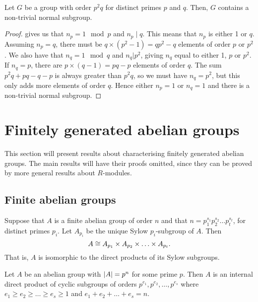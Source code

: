 \begin{lemma}
  Let \(G\) be a group with order \(p^{2}q\) for distinct primes \(p\) and \(q\). Then, \(G\) contains a non-trivial normal subgroup.
\end{lemma}

\begin{proof}
  gives us that \(n_{p} = 1 \mod p\) and \(n_{p} \mid q\). This means that \(n_{p}\) is either 1 or \(q\). Assuming \(n_{p} = q\), there must be \(q \times (p^{2}-1) = qp^{2} - q\) elements of order \(p\) or \(p^{2}\). We also have that \(n_{q} = 1 \mod q\) and \(n_{q} | p^{2}\), giving \(n_{q}\) equal to either 1, \(p\) or \(p^{2}\). If \(n_{q} = p\), there are \(p \times (q -1) = pq - p\) elements of order \(q\). The sum \(p^{2}q + pq -q -p\) is always greater than \(p^{2}q\), so we must have \(n_{q} = p^{2}\), but this only adds more elements of order \(q\). Hence either \(n_{p} =1 \) or \(n_{q} = 1\) and there is a non-trivial normal subgroup.
\end{proof}



\section{Finitely generated abelian groups}
This section will present results about characterising finitely generated abelian groups. The main results will have their proofs omitted, since they can be proved by more general results about \(R\)-modules.

\subsection{Finite abelian groups}

\begin{theorem}
  Suppose that \(A\) is a finite abelian group of order \(n\) and that \(n = p_{1}^{s_{1}}p_{2}^{s_{2}} \ldots p_{t}^{s_{t}}\), for distinct primes \(p_{i}\). Let \(A_{p_{i}}\) be the unique Sylow \(p_{i}\)-subgroup of \(A\). Then
  \[A \cong A_{p_{1}} \times A_{p_{2}} \times \ldots \times A_{p_{t}}.\]
  That is, \(A\) is isomorphic to the direct products of its Sylow subgroups.
\end{theorem}


\begin{theorem}
  Let \(A\) be an abelian group with \(\abs{A} = p^{n}\) for some prime \(p\). Then \(A\) is an internal direct product of cyclic subgroups of orders \(p^{e_{1}}, p^{e_{2}}, \ldots, p^{{e_{s}}}\) where \(e_{1} \geq e_{2} \geq \ldots \geq e_{s} \geq 1\) and \(e_{1} + e_{2} + \ldots + e_{s} = n\).
\end{theorem}

